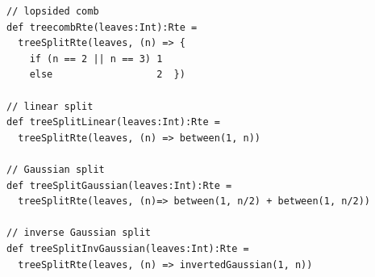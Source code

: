 \begin{lstlisting}[style=scalaioScala]
// lopsided comb
def treecombRte(leaves:Int):Rte =
  treeSplitRte(leaves, (n) => {
    if (n == 2 || n == 3) 1
    else                  2  })

// linear split
def treeSplitLinear(leaves:Int):Rte =
  treeSplitRte(leaves, (n) => between(1, n))

// Gaussian split
def treeSplitGaussian(leaves:Int):Rte =   
  treeSplitRte(leaves, (n)=> between(1, n/2) + between(1, n/2))

// inverse Gaussian split
def treeSplitInvGaussian(leaves:Int):Rte =   
  treeSplitRte(leaves, (n) => invertedGaussian(1, n))
\end{lstlisting}
